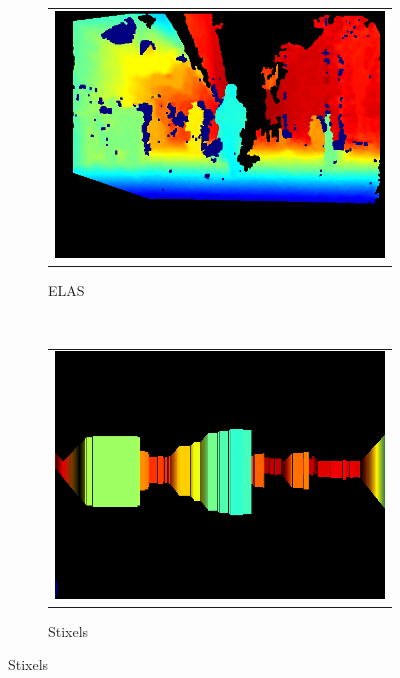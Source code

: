 \begin{figure}[h!]
        \centering
        \begin{subfigure}[b]{0.29\textwidth}
	  \begin{tabular}{c}
	    \includegraphics[height=0.375\figuresheight]{elas}
	  \end{tabular}
	  \caption{ELAS}\label{fig:cp04_reconstruction_elas}
        \end{subfigure}%
        ~~~
        \begin{subfigure}[b]{0.29\textwidth}
	  \begin{tabular}{c}
	    \includegraphics[height=0.375\figuresheight]{stixels}
	  \end{tabular}
	  \caption{Stixels}\label{fig:cp04_reconstruction_stixels}

\end{subfigure}
\end{figure}

